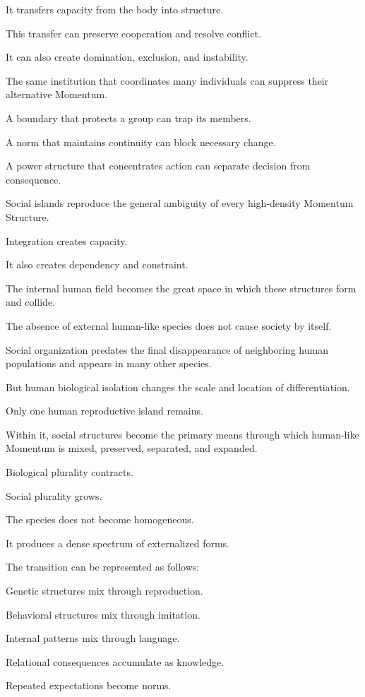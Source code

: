 It transfers capacity from the body into structure.

This transfer can preserve cooperation and resolve conflict.

It can also create domination, exclusion, and instability.

The same institution that coordinates many individuals can suppress their alternative Momentum.

A boundary that protects a group can trap its members.

A norm that maintains continuity can block necessary change.

A power structure that concentrates action can separate decision from consequence.

Social islands reproduce the general ambiguity of every high-density Momentum Structure.

Integration creates capacity.

It also creates dependency and constraint.

The internal human field becomes the great space in which these structures form and collide.

The absence of external human-like species does not cause society by itself.

Social organization predates the final disappearance of neighboring human populations and appears in many other species.

But human biological isolation changes the scale and location of differentiation.

Only one human reproductive island remains.

Within it, social structures become the primary means through which human-like Momentum is mixed, preserved, separated, and expanded.

Biological plurality contracts.

Social plurality grows.

The species does not become homogeneous.

It produces a dense spectrum of externalized forms.

The transition can be represented as follows:

Genetic structures mix through reproduction.

Behavioral structures mix through imitation.

Internal patterns mix through language.

Relational consequences accumulate as knowledge.

Repeated expectations become norms.

